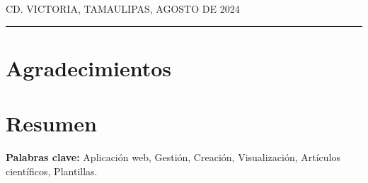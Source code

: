 \documentclass[12pt]{article}
\newcommand{\HRule}{\rule{\linewidth}{0.25mm}}
\newcommand{\fechaPortada}{Agosto de 2024}
\newcommand{\iemph}[1]{\MakeTextUppercase{#1}}
\begin{document}
\vfill

\begin{flushright}
\iemph{Cd. Victoria, Tamaulipas, \fechaPortada}
\end{flushright}

\HRule{}
\clearpage




\thispagestyle{fancy}

\clearpage


\thispagestyle{fancy}

\clearpage


\thispagestyle{fancy}

\clearpage









\ClearWallPaper{}
\pagestyle{fancy}
\section*{\centering Agradecimientos}



\clearpage
\section*{\centering Resumen}


\textbf{Palabras clave:} Aplicación web, Gestión, Creación, Visualización, Artículos científicos, Plantillas.
\end{document}
